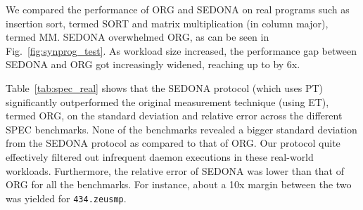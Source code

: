 \documentclass[letter]{ieice}
\begin{document}
{\color{blue}
We compared the performance of ORG and \hbox{SEDONA} on 
real programs such as insertion sort, termed SORT and 
matrix multiplication (in column major), termed MM. 
SEDONA overwhelmed ORG, as can be seen in Fig.~\ref{fig:synprog_test}. 
As workload size increased, 
the performance gap between SEDONA and ORG got increasingly widened, reaching up to by 6x.
}

Table~\ref{tab:spec_real} shows that
the SEDONA protocol (which uses PT) significantly outperformed the original 
measurement technique (using ET), termed ORG, 
on the standard deviation and relative error across the different SPEC benchmarks. 
None of the benchmarks revealed a bigger standard deviation from the SEDONA protocol as compared to that of ORG. 
Our protocol quite effectively filtered out infrequent daemon executions 
in these real-world workloads. 
Furthermore, the relative error of SEDONA was 
lower than that of ORG for all the benchmarks. 
For instance, about a 10x \hbox{margin} between the two was yielded for 
{\tt 434.zeusmp}.
\end{document}
